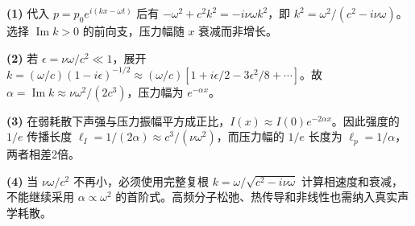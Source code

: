 \par\noindent\textbf{(1)} 代入 \(p=p_0e^{i(kx-\omega t)}\) 后有 \(-\omega^2+c^2k^2=-i\nu\omega k^2\)，即 \(k^2=\omega^2/(c^2-i\nu\omega)\)。选择 \(\operatorname{Im}k>0\) 的前向支，压力幅随 \(x\) 衰减而非增长。
\par\noindent\textbf{(2)} 若 \(\epsilon=\nu\omega/c^2\ll1\)，展开 \(k=(\omega/c)(1-i\epsilon)^{-1/2}\approx(\omega/c)[1+i\epsilon/2-3\epsilon^2/8+\cdots]\)。故 \(\alpha=\operatorname{Im}k\approx\nu\omega^2/(2c^3)\)，压力幅为 \(e^{-\alpha x}\)。
\par\noindent\textbf{(3)} 在弱耗散下声强与压力振幅平方成正比，\(I(x)\approx I(0)e^{-2\alpha x}\)。因此强度的 \(1/e\) 传播长度 \(\ell_I=1/(2\alpha)\approx c^3/(\nu\omega^2)\)，而压力幅的 \(1/e\) 长度为 \(\ell_p=1/\alpha\)，两者相差2倍。
\par\noindent\textbf{(4)} 当 \(\nu\omega/c^2\) 不再小，必须使用完整复根 \(k=\omega/\sqrt{c^2-i\nu\omega}\) 计算相速度和衰减，不能继续采用 \(\alpha\propto\omega^2\) 的首阶式。高频分子松弛、热传导和非线性也需纳入真实声学耗散。
